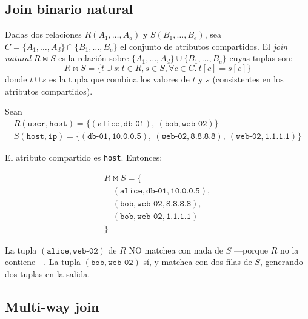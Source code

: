 \subsection{Join binario natural}

\begin{definition}
Dadas dos relaciones \(R(A_1, \dots, A_d)\) y \(S(B_1, \dots, B_e)\),
sea \(C = \{A_1, \dots, A_d\} \cap \{B_1, \dots, B_e\}\) el conjunto
de atributos compartidos. El \emph{join natural} \(R \bowtie S\) es
la relación sobre \(\{A_1, \dots, A_d\} \cup \{B_1, \dots, B_e\}\)
cuyas tuplas son:
\[
R \bowtie S = \{ t \cup s : t \in R, s \in S, \forall c \in C.\ t[c] = s[c] \}
\]
donde \(t \cup s\) es la tupla que combina los valores de \(t\) y
\(s\) (consistentes en los atributos compartidos).
\end{definition}

\begin{ejemplo}
Sean
\[
\begin{array}{l}
R(\texttt{user}, \texttt{host}) = \{ (\texttt{alice}, \texttt{db-01}),\ (\texttt{bob}, \texttt{web-02}) \} \\[0.3em]
S(\texttt{host}, \texttt{ip}) = \{ (\texttt{db-01}, \texttt{10.0.0.5}),\ (\texttt{web-02}, \texttt{8.8.8.8}),\ (\texttt{web-02}, \texttt{1.1.1.1}) \}
\end{array}
\]

El atributo compartido es \texttt{host}. Entonces:

\[
\begin{array}{l}
R \bowtie S = \{ \\
\quad (\texttt{alice}, \texttt{db-01}, \texttt{10.0.0.5}), \\
\quad (\texttt{bob}, \texttt{web-02}, \texttt{8.8.8.8}), \\
\quad (\texttt{bob}, \texttt{web-02}, \texttt{1.1.1.1}) \\
\}
\end{array}
\]

\noindent
La tupla \((\texttt{alice}, \texttt{web-02})\) de \(R\) NO matchea
con nada de \(S\) ---porque \(R\) no la contiene---. La tupla
\((\texttt{bob}, \texttt{web-02})\) sí, y matchea con dos filas de
\(S\), generando dos tuplas en la salida.
\end{ejemplo}

\subsection{Multi-way join}

